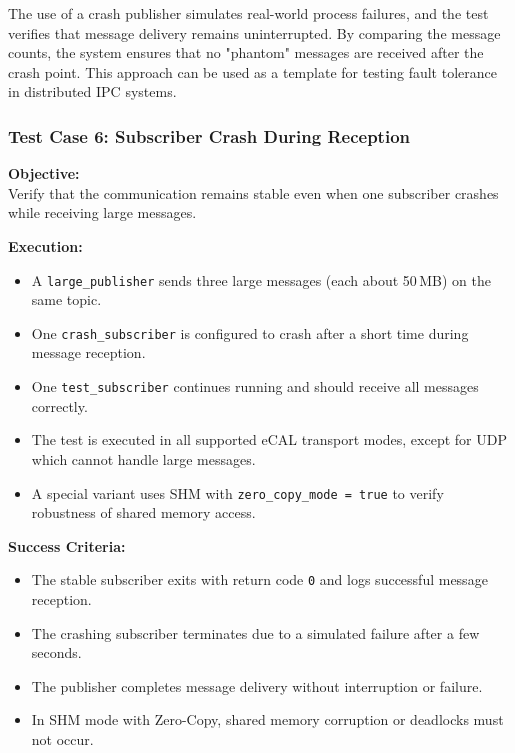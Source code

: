 \vspace{1em}

The use of a crash publisher simulates real-world process failures, and the test verifies that message delivery remains uninterrupted. By comparing the message counts, the system ensures that no "phantom" messages are received after the crash point. This approach can be used as a template for testing fault tolerance in distributed IPC systems.

\vspace{1em}
\subsubsection{Test Case 6: Subscriber Crash During Reception}
\label{sec:tc6}

\textbf{Objective:} \\
Verify that the communication remains stable even when one subscriber crashes while receiving large messages.

\vspace{0.5em}
\textbf{Execution:}
\begin{itemize}
	\item A \texttt{large\_publisher} sends three large messages (each about 50\,MB) on the same topic.
	\item One \texttt{crash\_subscriber} is configured to crash after a short time during message reception.
	\item One \texttt{test\_subscriber} continues running and should receive all messages correctly.
	\item The test is executed in all supported eCAL transport modes, except for UDP which cannot handle large messages.
	\item A special variant uses SHM with \texttt{zero\_copy\_mode = true} to verify robustness of shared memory access.
\end{itemize}

\textbf{Success Criteria:}
\begin{itemize}
	\item The stable subscriber exits with return code \texttt{0} and logs successful message reception.
	\item The crashing subscriber terminates due to a simulated failure after a few seconds.
	\item The publisher completes message delivery without interruption or failure.
	\item In SHM mode with Zero-Copy, shared memory corruption or deadlocks must not occur.
\end{itemize}


